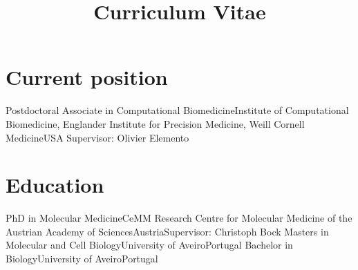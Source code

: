 \documentclass[11pt,a4paper,roman]{moderncv} %
\title{Curriculum Vitae}
\begin{document}
\makecvtitle %


\section{Current position}
    {Postdoctoral Associate in Computational Biomedicine}{Institute of Computational Biomedicine, Englander Institute for Precision Medicine, Weill Cornell Medicine}{USA}
    {}{Supervisor: Olivier Elemento}


\section{Education}
        {PhD in Molecular Medicine}{CeMM Research Centre for Molecular Medicine of the Austrian Academy of Sciences}{Austria}{}{Supervisor: Christoph Bock}
        {Masters in Molecular and Cell Biology}{University of Aveiro}{Portugal}{}{}
        {Bachelor in Biology}{University of Aveiro}{Portugal}{}{}


\end{document}
